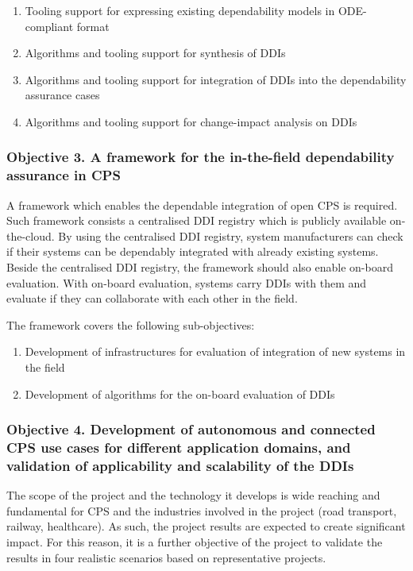 \begin{enumerate}
	\item Tooling support for expressing existing dependability models in ODE-compliant format
	\item Algorithms and tooling support for synthesis of DDIs
	\item Algorithms and tooling support for integration of DDIs into the dependability assurance cases
	\item Algorithms and tooling support for change-impact analysis on DDIs
\end{enumerate}

\subsubsection{Objective 3. A framework for the in-the-field dependability assurance in CPS}
A framework which enables the dependable integration of open CPS is required. Such framework consists a centralised DDI registry which is publicly available on-the-cloud. By using the centralised DDI registry, system manufacturers can check if their systems can be dependably integrated with already existing systems. Beside the centralised DDI registry, the framework should also enable on-board evaluation. With on-board evaluation, systems carry DDIs with them and evaluate if they can collaborate with each other in the field.

The framework covers the following sub-objectives:

\begin{enumerate}
	\item Development of infrastructures for evaluation of integration of new systems in the field
	\item Development of algorithms for the on-board evaluation of DDIs
\end{enumerate}

\subsubsection{Objective 4. Development of autonomous and connected CPS use cases for different application domains, and validation of applicability and scalability of the DDIs}
The scope of the project and the technology it develops is wide reaching and fundamental for CPS and the industries involved in the project (road transport, railway, healthcare). As such, the project results are expected to create significant impact. For this reason, it is a further objective of the project to validate the results in four realistic scenarios based on representative projects. %

